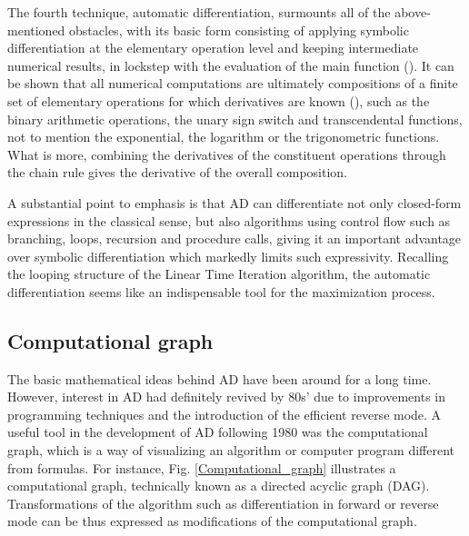\documentclass{pracamgr}
\numberwithin{equation}{section}
\begin{document}
The fourth technique, automatic differentiation, surmounts all of the above-mentioned obstacles, with its basic form consisting of applying symbolic differentiation at the elementary operation level and keeping intermediate numerical results, in lockstep with the evaluation of the main function (\citet{baydin2018automatic}). It can be shown that all numerical computations are ultimately compositions of a finite set of elementary operations for which derivatives are known (\citet{griewank2008evaluating}), such as the binary arithmetic operations, the unary sign switch and transcendental functions, not to mention the exponential, the logarithm or the trigonometric functions. What is more, combining the derivatives of the constituent operations through the chain rule gives the derivative of the overall composition.

A substantial point to emphasis is that AD can differentiate not only closed-form expressions in the classical sense, but also algorithms using control flow such as branching, loops, recursion and procedure calls, giving it an important advantage over symbolic differentiation which markedly limits such expressivity. Recalling the looping structure of the Linear Time Iteration algorithm, the automatic differentiation seems like an indispensable tool for the maximization process.

\subsection{Computational graph}

The basic mathematical ideas behind AD have been around for a long time. However, interest in AD had definitely revived by 80s' due to improvements in programming techniques and the introduction of the efficient reverse mode. A useful tool in the development of AD following 1980 was the computational graph, which is a way of visualizing an algorithm or computer program different from formulas. For instance, Fig. \ref{Computational_graph} illustrates a computational graph, technically known as a directed acyclic graph (DAG). Transformations of the algorithm such as differentiation in forward or reverse mode can be thus expressed as modifications of the computational graph.

\newpage
\end{document}
